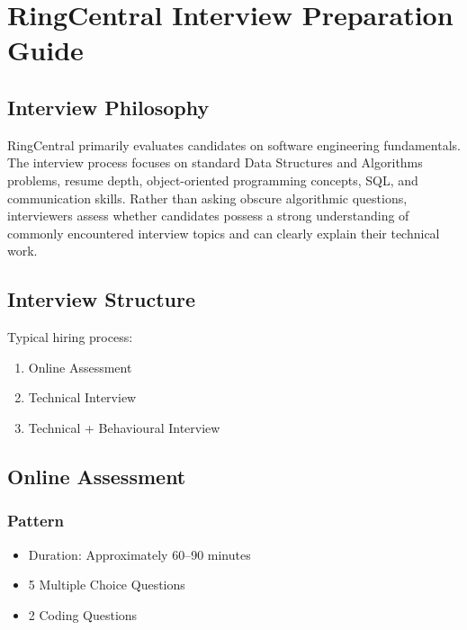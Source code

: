 \documentclass[11pt,a4paper]{article}
\begin{document}
\section{RingCentral Interview Preparation Guide}

\subsection{Interview Philosophy}

RingCentral primarily evaluates candidates on software engineering fundamentals. The interview process focuses on standard Data Structures and Algorithms problems, resume depth, object-oriented programming concepts, SQL, and communication skills. Rather than asking obscure algorithmic questions, interviewers assess whether candidates possess a strong understanding of commonly encountered interview topics and can clearly explain their technical work.


\subsection{Interview Structure}

Typical hiring process:

\begin{enumerate}
	\item Online Assessment
	\item Technical Interview
	\item Technical + Behavioural Interview
\end{enumerate}


\subsection{Online Assessment}

\subsubsection{Pattern}

\begin{itemize}
	\item Duration: Approximately 60--90 minutes
	\item 5 Multiple Choice Questions
	\item 2 Coding Questions
\end{itemize}
\end{document}
